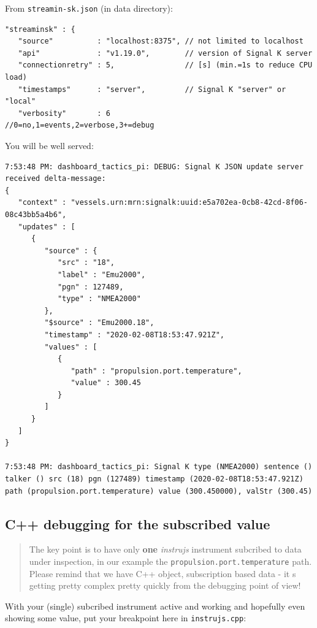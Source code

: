 \documentclass[11pt]{article}
\begin{document}
    From \texttt{streamin-sk.json} (in data directory):

\begin{verbatim}
"streaminsk" : {
   "source"          : "localhost:8375", // not limited to localhost
   "api"             : "v1.19.0",        // version of Signal K server
   "connectionretry" : 5,                // [s] (min.=1s to reduce CPU load)
   "timestamps"      : "server",         // Signal K "server" or "local"
   "verbosity"       : 6                 //0=no,1=events,2=verbose,3+=debug
\end{verbatim}

    You will be well served:

    \begin{verbatim}
7:53:48 PM: dashboard_tactics_pi: DEBUG: Signal K JSON update server received delta-message:
{
   "context" : "vessels.urn:mrn:signalk:uuid:e5a702ea-0cb8-42cd-8f06-08c43bb5a4b6",
   "updates" : [
      {
         "source" : {
            "src" : "18",
            "label" : "Emu2000",
            "pgn" : 127489,
            "type" : "NMEA2000"
         },
         "$source" : "Emu2000.18",
         "timestamp" : "2020-02-08T18:53:47.921Z",
         "values" : [
            {
               "path" : "propulsion.port.temperature",
               "value" : 300.45
            }
         ]
      }
   ]
}

7:53:48 PM: dashboard_tactics_pi: Signal K type (NMEA2000) sentence () talker () src (18) pgn (127489) timestamp (2020-02-08T18:53:47.921Z) path (propulsion.port.temperature) value (300.450000), valStr (300.45)
\end{verbatim}

    \hypertarget{c-debugging-for-the-subscribed-value}{%
\subsection{C++ debugging for the subscribed
value}\label{c-debugging-for-the-subscribed-value}}

    \begin{quote}
The key point is to have only \textbf{one} \emph{instrujs} instrument
subcribed to data under inspection, in our example the
\texttt{propulsion.port.temperature} path. Please remind that we have
C++ object, subscription based data - it s getting pretty complex pretty
quickly from the debugging point of view!
\end{quote}

    With your (single) subcribed instrument active and working and hopefully
even showing some value, put your breakpoint here in
\texttt{instrujs.cpp}:
\end{document}
